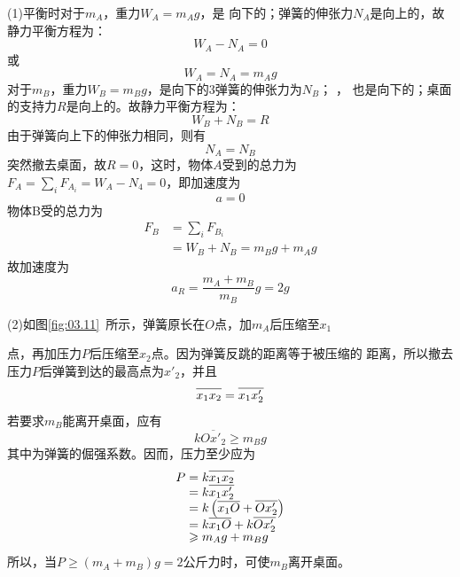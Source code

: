 \solution (1)平衡时对于$ m_A $，重力$ W _ { A } = m _ { A } g $，是
向下的；弹簧的伸张力$ N _ { A } $是向上的，故静力平衡方程为：\vspace{-0.5em}
\begin{equation*}
	W _ { A } - N _ { A } = 0
\end{equation*}
或\vspace{-1.56em}
\begin{equation*}
	W _ { A } = N _ { A } = m _ { A } g
\end{equation*}
对于$ m_B $，重力$ W _ { B } = m _ { B } g $，是向下的3弹簧的伸张力为$ N _ { B } $； ，
也是向下的；桌面的支持力$ R $是向上的。故静力平衡方程为：
\begin{equation*}
	W _ { B } + N _ { B } = R
\end{equation*}
由于弹簧向上下的伸张力相同，则有
\begin{equation*}
	N _ { A } = N _ { B }
\end{equation*}
突然撤去桌面，故$  R = 0  $，这时，物体$ A $受到的总力为$  F _ { A } =
\sum _ i F _ { A _ i } = W _ { A } - N _ { 4 } = 0  $，即加速度为
\begin{equation*}
	a = 0
\end{equation*}
物体B受的总力为
\begin{align*}
	F _ { B } &= \sum _ i F _ { B _ i } \\
		&= W _ { B } + N _ { B } = m _ { B } g + m _ { A } g
\end{align*}
故加速度为
\begin{equation*}
	a _ { R } = \frac { m _ { A } + m _ { B } } { m _ { B } } g = 2 g
\end{equation*}

(2)如图\ref{fig:03.11}~所示，弹簧原长在$ O $点，加$ m_{A} $后压缩至$ x_{1} $

\noindent 点，再加压力$ P $后压缩至$ x_{2} $点。因为弹簧反跳的距离等于被压缩的
距离，所以撤去压力$ P $后弹簧到达的最高点为$  x'_ { 2 }  $，并且
\begin{equation*}
	\overline{ x _ { 1 } x _ { 2 } \llap{\phantom{'}} } = \overline{ x _ { 1 } x' _ { 2 }}
\end{equation*}
若要求$ m_B $能离开桌面，应有
\begin{equation*}
	k \overline{ O x' _ { 2 } } \geqslant m _ { B } g
\end{equation*}
其中为弹簧的倔强系数。因而，压力至少应为
\begin{align*}
	P &= k \overline{ x _ { 1 } x _ { 2 } \llap{\phantom{'}}} \\[-0.5em]
	  &= k \overline{ x _ { 1 } x ' _ { 2 } } \\[-0.5em]
	  &= k \left( \overline{ x _ { 1 } O \llap{\phantom{'}} } + \overline{ O x ' _ { 2 } } \right) \\[-0.5em]
	  &= k \overline { x _ { 1 } O \llap{\phantom{'}}} + k \overline { O x '_2} \\[-0.5em]
	  &\geqslant m _ { A } g + m _ { B } g
\end{align*}
所以，当$  P \geqslant \left( m _ { A } + m _ { B } \right) g = 2 \text{公斤力} $时，可使$ m_{B} $离开桌面。

